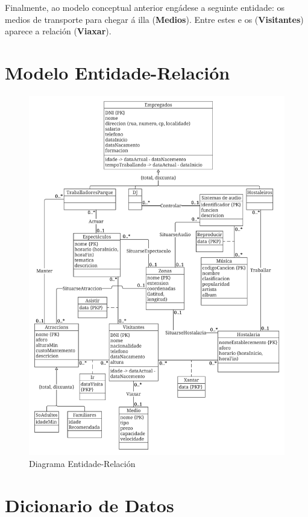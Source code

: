 \documentclass[12pt,a4paper]{book}
\theoremstyle{definition}
\theoremstyle{break}
\begin{document}
	Finalmente, ao modelo conceptual anterior engádese a seguinte entidade: os medios de transporte para chegar á illa (\textbf{Medios}). Entre estes e os (\textbf{Visitantes}) aparece a relación (\textbf{Viaxar}).
	
	
	\newpage
	
	\section{Modelo Entidade-Relación}
	
	\begin{figure} [H] \centering
		\caption{Diagrama Entidade-Relación}
		\includegraphics[width=\textwidth]{MER inicial.pdf}
	\end{figure}
	\newpage
	
	\section{Dicionario de Datos}
	
\end{document}
